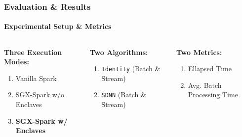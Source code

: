 \documentclass[10pt,    %
    english,            %
    xcolor=table,       %
    envcountsect,        %
    aspectratio=169     %
]{beamer}
\begin{document}
\begin{frame}
    \frametitle{Evaluation \& Results}
    \framesubtitle{Experimental Setup \& Metrics}

    \vspace{-20pt}

    \begin{columns}[T]
        \begin{column}{.38\textwidth}
            \textbf{Three Execution Modes:}
            \begin{enumerate}
                \item Vanilla Spark
                \item SGX-Spark w/o Enclaves
                \item \textbf{\textcolor{fgRed}{SGX-Spark w/ Enclaves}}
            \end{enumerate}
        \end{column}
        \begin{column}{.3\textwidth}
            \textbf{Two Algorithms:}
            \begin{enumerate}
                \item \texttt{Identity} (Batch \& Stream)
                \item \texttt{SDNN} (Batch \& Stream)
            \end{enumerate}
        \end{column}
        \begin{column}{.3\textwidth}
            \textbf{Two Metrics:}
            \begin{enumerate}
                \item Ellapsed Time
                \item Avg. Batch Processing Time
            \end{enumerate}
        \end{column}
    \end{columns}


\end{frame}
\end{document}

